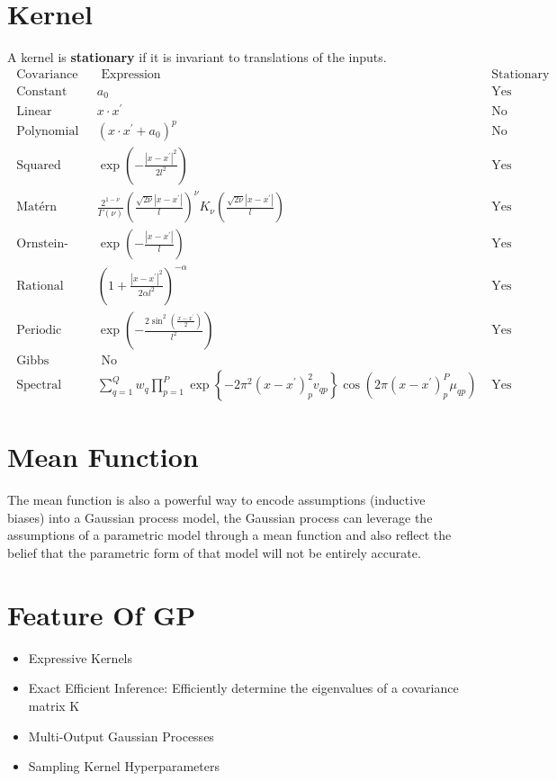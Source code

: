 \documentclass{article}
\begin{document}
\section{Kernel}
A kernel is \textbf{stationary} if it is invariant to translations of the inputs.
$$
    \begin{array}{lrr}
    \hline \text { Covariance function } & \text { Expression } & \text { Stationary } \\
    \hline \text { Constant } & a_{0} & \text { Yes } \\
    \text { Linear } & x \cdot x^{\prime} & \text { No } \\
    \text { Polynomial } & \left(x \cdot x^{\prime}+a_{0}\right)^{p} & \text { No } \\
    \text { Squared Exponential } & \exp \left(-\frac{\left|x-x^{\prime}\right|^{2}}{2 l^{2}}\right) & \text { Yes } \\
    \text { Matérn } & \frac{2^{1-\nu}}{\Gamma(\nu)}\left(\frac{\sqrt{2 \nu}\left|x-x^{\prime}\right|}{l}\right)^{\nu} K_{\nu}\left(\frac{\sqrt{2 \nu}\left|x-x^{\prime}\right|}{l}\right) & \text { Yes } \\
    \text { Ornstein-Uhlenbeck } & \exp \left(-\frac{\left|x-x^{\prime}\right|}{l}\right) & \text { Yes } \\
    \text { Rational Quadratic } & \left(1+\frac{\left|x-x^{\prime}\right|^{2}}{2 \alpha l^{2}}\right)^{-\alpha} & \text { Yes } \\
    \text { Periodic } & \exp \left(-\frac{2 \sin ^{2}\left(\frac{x-x^{\prime}}{2}\right)}{l^{2}}\right) & \text { Yes } \\
    \text { Gibbs } & \text { No } \\
    \text { Spectral Mixture } & \sum_{q=1}^{Q} w_{q} \prod_{p=1}^{P} \exp \left\{-2 \pi^{2}\left(x-x^{\prime}\right)_{p}^{2} v_{q p}\right\} \cos \left(2 \pi\left(x-x^{\prime}\right)_{p}^{P} \mu_{q p}\right) & \text { Yes }
    \end{array}
$$
\section{Mean Function}
The mean function is also a powerful way to encode assumptions (inductive biases) into a Gaussian process model, the Gaussian process can leverage the assumptions of a parametric model through a mean function and also reﬂect the belief that the parametric form of that model will not be entirely accurate.

\section{Feature Of GP}
\begin{itemize}
    \item Expressive Kernels
    \item Exact Eﬃcient Inference: Efficiently determine the eigenvalues of a covariance matrix K
    \item Multi-Output Gaussian Processes
    \item Sampling Kernel Hyperparameters
\end{itemize}



\nocite{*}
\appendix
\end{document}
